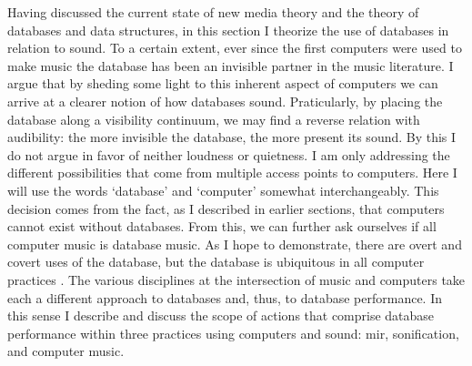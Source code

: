 
Having discussed the current state of new media theory and the theory of databases and data structures, in this section I theorize the use of databases in relation to sound. To a certain extent, ever since the first computers were used to make music the database has been an invisible partner in the music literature. I argue that by sheding some light to this inherent aspect of computers we can arrive at a clearer notion of how databases sound. Praticularly, by placing the database along a visibility continuum, we may find a reverse relation with audibility: the more invisible the database, the more present its sound. By this I do not argue in favor of neither loudness or quietness. I am only addressing the different possibilities that come from multiple access points to computers. Here I will use the words `database' and `computer' somewhat interchangeably. This decision comes from the fact, as I described in earlier sections, that computers cannot exist without databases. From this, we can further ask ourselves if all computer music is database music. As I hope to demonstrate, there are overt and covert uses of the database, but the database is ubiquitous in all computer practices . The various disciplines at the intersection of music and computers take each a different approach to databases and, thus, to database performance. In this sense I describe and discuss the scope of actions that comprise database performance within three practices using computers and sound: \gls{mir}, sonification, and computer music.